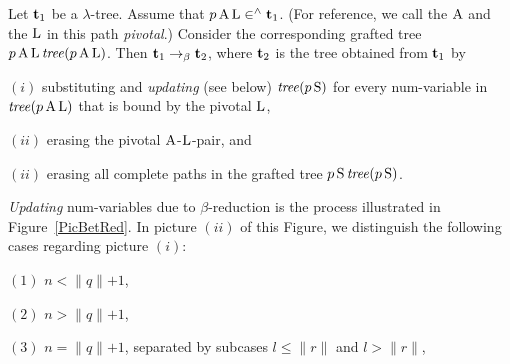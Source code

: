 \documentclass[submission,copyright,creativecommons]{eptcs}
\begin{document}

\begin{Def}\label{DefUsuBet} Let ${\bf t}_1$ be a $\lambda$-tree. Assume that $p \, {\rm A} \, {\rm L} \in^{\wedge} {\bf t}_1$. (For reference, we call the ${\rm A}$ and the ${\rm L}$ in this path {\em pivotal\/}.)
Consider the corresponding grafted tree $p \, {\rm A} \, {\rm L} \, {\it tree}(p \, {\rm A} \, {\rm L})$.
Then ${\bf t}_1 \rightarrow_{\beta} {\bf t}_2$, where ${\bf t}_2$ is the tree obtained from ${\bf t}_1$ by

\smallskip

$(i)$ substituting and {\it updating\/} (see below) ${\it tree}(p \, {\rm S})$ for every num-variable in ${\it tree}(p \, {\rm A} \, {\rm L})$ that is bound by the pivotal ${\rm L}$,

$(ii)$ erasing the pivotal ${\rm A}$-${\rm L}$-pair, and

$(ii)$ erasing all complete paths in the grafted tree $p \, {\rm S} \, {\it tree}(p \, {\rm S})$.

\end{Def}



\begin{Def}\label{DefUsuUpd}
{\em Updating\/} num-variables due to $\beta$-reduction is the process illustrated in Figure~\ref{PicBetRed}. In picture $(ii)$ of this Figure, we distinguish the following cases regarding picture $(i)$:

$(1)$ $n < \lVert q \lVert + 1$,

$(2)$ $n > \lVert q \lVert + 1$,

$(3)$ $n = \lVert q \lVert + 1$, separated by subcases $l \leq \lVert r \lVert$ and $l > \lVert r \lVert$,


\end{Def}
\end{document}
